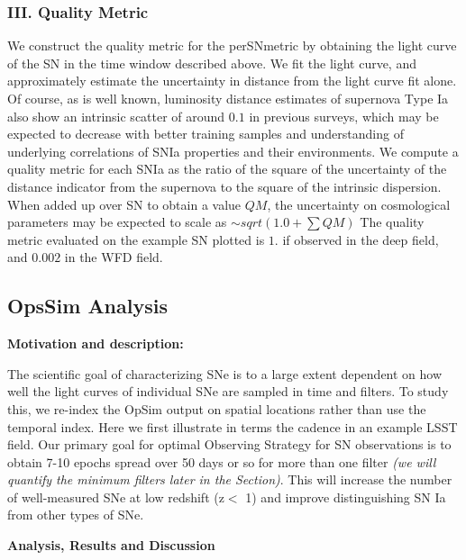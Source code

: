 \subsubsection{III. Quality Metric}
We construct the quality metric for the perSNmetric by obtaining the light curve of the SN
in the time window described above. We fit the light curve, and approximately estimate the
uncertainty in distance from the light curve fit alone. Of course, as is well known,
luminosity distance estimates of supernova Type Ia also show an intrinsic scatter of
around $0.1$ in previous surveys, which may be expected to decrease with better training
samples and understanding of underlying correlations of SNIa properties and their
environments. We compute a quality metric for each SNIa as the ratio of the square of the
uncertainty of the distance indicator from the supernova to the square of the intrinsic
dispersion. When added up over SN to obtain a value $QM$, the uncertainty on cosmological
parameters may be expected to scale as $\sim sqrt(1.0 + \sum QM)$ The quality metric evaluated on 
the example SN plotted is $1.$ if observed in the deep field, and $0.002$ in
the WFD field.





\subsection{OpsSim Analysis}
\label{sec:keyword:analysis}

{\bf Motivation and description:}

The scientific goal of characterizing SNe is to a large extent dependent on
how well the light curves of individual SNe are sampled in time and filters. To study
this, we re-index the OpSim output on spatial locations rather than use the temporal
index. Here we first
illustrate  in terms the cadence in an example LSST field. Our primary goal for optimal Observing
Strategy for SN observations is to obtain 7-10 epochs spread over 50 days or so for more than one filter {\it (we
will quantify the minimum filters later in the Section)}. This will increase the number of
well-measured SNe at low redshift (z$<$ 1) and improve distinguishing SN Ia from other
types of SNe.

{\bf Analysis, Results and Discussion}


